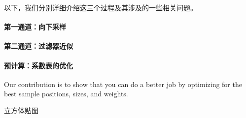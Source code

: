 以下，我们分别详细介绍这三个过程及其涉及的一些相关问题。



\paragraph{第一通道：向下采样}





\paragraph{第二通道：过滤器近似}
\paragraph{预计算：系数表的优化}






Our contribution is to show that you can do a better job by optimizing for the best sample positions, sizes, and weights.


立方体贴图

\cite{a:FastFilteringofReflectionProbes}



